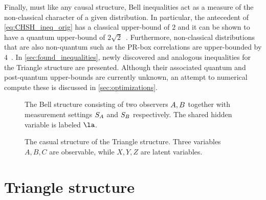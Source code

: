 \documentclass[aps, 10pt, english, twoside, pra, nofootinbib, tightenlines, longbibliography, superscriptaddress]{revtex4-1}
\begin{document}
    Finally, must like any causal structure, Bell inequalities act as a measure of the non-classical character of a given distribution. In particular, the antecedent of \cref{eq:CHSH_ineq_orig} has a classical upper-bound of $2$ and it can be shown to have a quantum upper-bound of $2\sqrt{2}$~\cite{Cirelson_1980}. Furthermore, non-classical distributions that are also non-quantum such as the PR-box correlations are upper-bounded by $4$~\cite{PR_1995}. In \cref{sec:found_inequalities}, newly discovered and analogous inequalities for the Triangle structure are presented. Although their associated quantum and post-quantum upper-bounds are currently unknown, an attempt to numerical compute these is discussed in \cref{sec:optimizations}.

    \begin{figure}
    \begin{center}
        \begin{minipage}[t]{.48\textwidth}
            \centering
            \scalebox{1.0}{}
            \caption{The Bell structure consisting of two observers $A, B$ together with measurement settings $S_{A}$ and $S_{B}$ respectively. The shared hidden variable is labeled $\la$.}
            \label{fig:bell_structure}
        \end{minipage}\hspace{0.04\textwidth}%
        \begin{minipage}[t]{.48\textwidth}
            \centering
            \scalebox{1.0}{}
            \caption{The casual structure of the Triangle structure. Three variables $A,B,C$ are observable, while $X, Y, Z$ are latent variables.}
            \label{fig:triangle_structure}
        \end{minipage}
    \end{center}
    \end{figure}
    \section{Triangle structure}
    \label{sec:triangle_structure}
\end{document}
